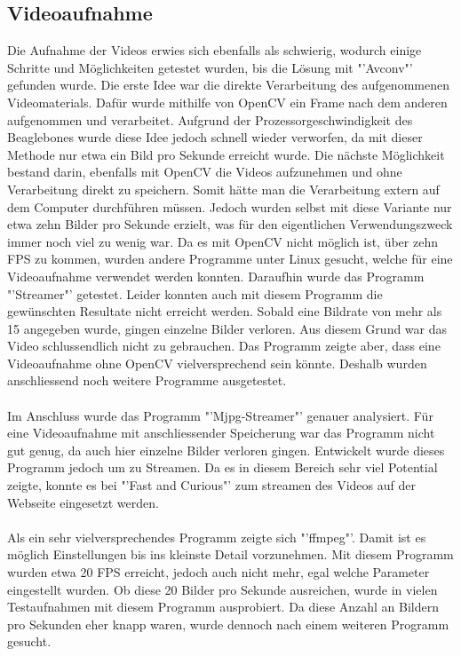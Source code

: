 \subsection{Videoaufnahme}
Die Aufnahme der Videos erwies sich ebenfalls als schwierig, wodurch einige Schritte und Möglichkeiten getestet wurden, bis die Lösung mit "'Avconv"' gefunden wurde. Die erste Idee war die direkte Verarbeitung des aufgenommenen Videomaterials. Dafür wurde mithilfe von OpenCV ein Frame nach dem anderen aufgenommen und verarbeitet. Aufgrund der Prozessorgeschwindigkeit des Beaglebones wurde diese Idee jedoch schnell wieder verworfen, da mit dieser Methode nur etwa ein Bild pro Sekunde erreicht wurde. Die nächste Möglichkeit bestand darin, ebenfalls mit OpenCV die Videos aufzunehmen und ohne Verarbeitung direkt zu speichern. Somit hätte man die Verarbeitung extern auf dem Computer durchführen müssen. Jedoch wurden selbst mit diese Variante nur etwa zehn Bilder pro Sekunde erzielt, was für den eigentlichen Verwendungszweck immer noch viel zu wenig war. Da es mit OpenCV nicht möglich ist, über zehn FPS zu kommen, wurden andere Programme unter Linux gesucht, welche für eine Videoaufnahme verwendet werden konnten. Daraufhin wurde das Programm "'Streamer"' getestet. Leider konnten auch mit diesem Programm die gewünschten Resultate nicht erreicht werden. Sobald eine Bildrate von mehr als 15 angegeben wurde, gingen einzelne Bilder verloren. Aus diesem Grund war das Video schlussendlich nicht zu gebrauchen. Das Programm zeigte aber, dass eine Videoaufnahme ohne OpenCV vielversprechend sein könnte. Deshalb wurden anschliessend noch weitere Programme ausgetestet. \cite{Streamer}\\\\
Im Anschluss wurde das Programm "'Mjpg-Streamer"' genauer analysiert. Für eine Videoaufnahme mit anschliessender Speicherung war das Programm nicht gut genug, da auch hier einzelne Bilder verloren gingen. Entwickelt wurde dieses Programm jedoch um zu Streamen. Da es in diesem Bereich sehr viel Potential zeigte, konnte es bei "'Fast and Curious"' zum streamen des Videos auf der Webseite eingesetzt werden. \cite{MjpgStreamer} \\\\
Als ein sehr vielversprechendes Programm zeigte sich "'ffmpeg"'. Damit ist es möglich Einstellungen bis ins kleinste Detail vorzunehmen. Mit diesem Programm wurden etwa 20 FPS erreicht, jedoch auch nicht mehr, egal welche Parameter eingestellt wurden. Ob diese 20 Bilder pro Sekunde ausreichen, wurde in vielen Testaufnahmen mit diesem Programm ausprobiert. Da diese Anzahl an Bildern pro Sekunden eher knapp waren, wurde dennoch nach einem weiteren Programm gesucht. \cite{Ffmpeg} \\\\

